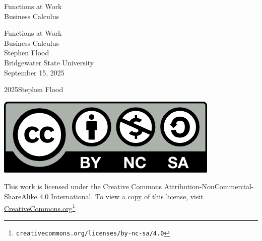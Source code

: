 \documentclass[oneside,10pt,]{tufte-book}
\newcommand{\titlepagefont}{\relax}
\numberwithin{equation}{chapter}
\begin{document}
\raggedbottom
\frontmatter
\thispagestyle{empty}
{\titlepagefont\centering
\vspace*{0.28\textheight}
{\Huge Functions at Work}\\[2\baselineskip]
{\LARGE Business Calculus}\\
}
\clearpage
\thispagestyle{empty}
{\titlepagefont\centering
\vspace*{0.14\textheight}
{\Huge Functions at Work}\\[\baselineskip]
{\LARGE Business Calculus}\\[3\baselineskip]
{\Large Stephen Flood}\\[0.5\baselineskip]
{\Large Bridgewater State University}\\[3\baselineskip]
{\Large September 15, 2025}\\}
\clearpage
\thispagestyle{empty}
\hypertarget{frontmatter-2}{}
\noindent\textcopyright{}2025\quad{}Stephen Flood\\[0.5\baselineskip]
\begin{image}{0.425}{0.15}{0.425}{}%
\includegraphics[width=\linewidth]{external/by-nc-sa.png}
\end{image}%
 This work is licensed under the Creative Commons Attribution-NonCommercial-ShareAlike 4.0 International. To view a copy of this license, visit \href{https://creativecommons.org/licenses/by-nc-sa/4.0/}{CreativeCommons.org}\footnote{\nolinkurl{creativecommons.org/licenses/by-nc-sa/4.0}\label{frontmatter-2-2-4-3}}\par\medskip
{}
\null\clearpage
\cleardoublepage
\end{document}
